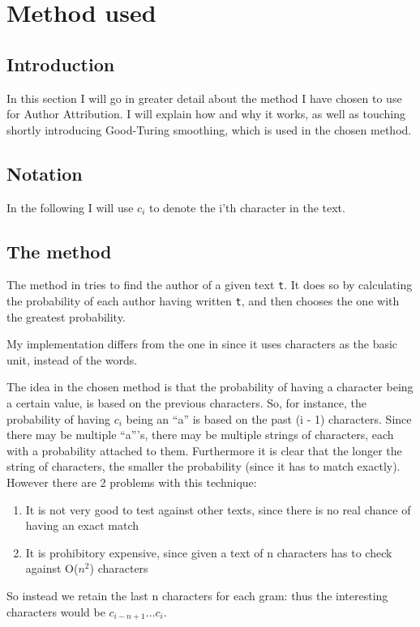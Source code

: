 \section{Method used}
\label{method}

\subsection{Introduction}
In this section I will go in greater detail about the method I have chosen to use for Author Attribution. I will explain how and why it works, as well as touching shortly introducing Good-Turing smoothing, which is used in the chosen method.

\subsection{Notation}
In the following I will use $c_i$ to denote the i'th character in the text.

\subsection{The method}
The method in \cite{nr4} tries to find the author of a given text \texttt{t}. It does so by calculating the probability of each author having written \texttt{t}, and then chooses the one with the greatest probability.

My implementation differs from the one in \cite{nr4} since it uses characters as the basic unit, instead of the words. 

The idea in the chosen method is that the probability of having a character being a certain value, is based on the previous characters. So, for instance, the probability of having $c_i$ being an ``a'' is based on the past (i - 1) characters. Since there may be multiple ``a'''s, there may be multiple strings of characters, each with a probability attached to them. Furthermore it is clear that the longer the string of characters, the smaller the probability (since it has to match exactly). However there are 2 problems with this technique:
\begin{enumerate}
\item It is not very good to test against other texts, since there is no real chance of having an exact match
\item It is prohibitory expensive, since given a text of n characters has to check against O($n^2$) characters  
\end{enumerate}
So instead we retain the last n characters for each gram: thus the interesting characters would be $c_{i - n + 1} \ldots c_{i}$.\\

